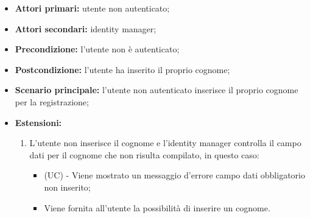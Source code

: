 \begin{itemize}
	\item \textbf{Attori primari:} utente non autenticato;
	\item \textbf{Attori secondari:} identity manager;
	\item \textbf{Precondizione:} l'utente non è autenticato;
	\item \textbf{Postcondizione:} l'utente ha inserito il proprio cognome;
	\item \textbf{Scenario principale:} l'utente non autenticato inserisce il proprio cognome per la registrazione;
	\item \textbf{Estensioni:}
	\begin{enumerate}[label=\lett]
		\item L'utente non inserisce il cognome e l'identity manager controlla il campo dati per il cognome che non risulta compilato, in questo caso:
		\begin{itemize}
			\item (UC) - Viene mostrato un messaggio d'errore campo dati obbligatorio non inserito;
			\item Viene fornita all'utente la possibilità di inserire un cognome.
		\end{itemize}
	\end{enumerate}
\end{itemize}

